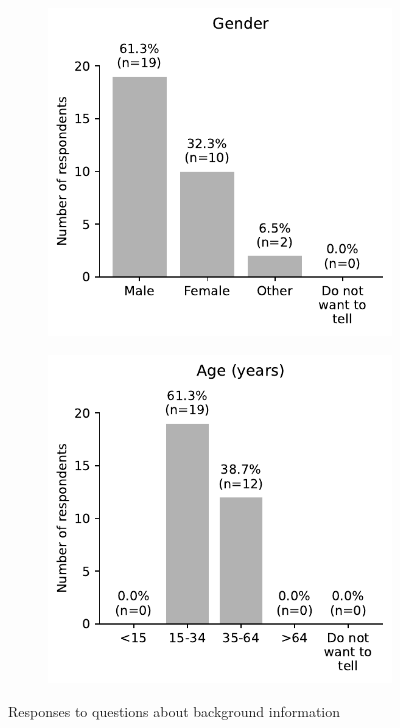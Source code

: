 \begin{appendices}
\begin{figure}[H]
	\begin{subfigure}[b]{0.5\textwidth}
		\includegraphics[width=\textwidth]{visual/figures/survey/13.pdf}
	\end{subfigure}%
	\hfill
	\begin{subfigure}[b]{0.5\textwidth}
		\includegraphics[width=\textwidth]{visual/figures/survey/14.pdf}
	\end{subfigure}%
	\newline
	Responses to questions about background information
\end{figure}


\end{appendices}
